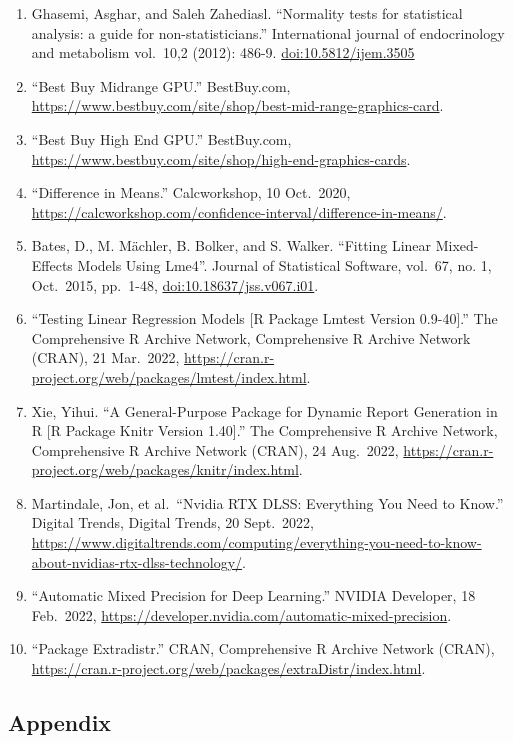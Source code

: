 \documentclass[
]{article}
\begin{document}
\begin{enumerate}
\item
  Ghasemi, Asghar, and Saleh Zahediasl. ``Normality tests for
  statistical analysis: a guide for non-statisticians.'' International
  journal of endocrinology and metabolism vol.~10,2 (2012): 486-9.
  \url{doi:10.5812/ijem.3505}
\item
  ``Best Buy Midrange GPU.'' BestBuy.com,
  \url{https://www.bestbuy.com/site/shop/best-mid-range-graphics-card}.
\item
  ``Best Buy High End GPU.'' BestBuy.com,
  \url{https://www.bestbuy.com/site/shop/high-end-graphics-cards}.
\item
  ``Difference in Means.'' Calcworkshop, 10 Oct.~2020,
  \url{https://calcworkshop.com/confidence-interval/difference-in-means/}.
\item
  Bates, D., M. Mächler, B. Bolker, and S. Walker. ``Fitting Linear
  Mixed-Effects Models Using Lme4''. Journal of Statistical Software,
  vol.~67, no. 1, Oct.~2015, pp.~1-48, \url{doi:10.18637/jss.v067.i01}.
\item
  ``Testing Linear Regression Models {[}R Package Lmtest Version
  0.9-40{]}.'' The Comprehensive R Archive Network, Comprehensive R
  Archive Network (CRAN), 21 Mar.~2022,
  \url{https://cran.r-project.org/web/packages/lmtest/index.html}.
\item
  Xie, Yihui. ``A General-Purpose Package for Dynamic Report Generation
  in R {[}R Package Knitr Version 1.40{]}.'' The Comprehensive R Archive
  Network, Comprehensive R Archive Network (CRAN), 24 Aug.~2022,
  \url{https://cran.r-project.org/web/packages/knitr/index.html}.
\item
  Martindale, Jon, et al.~``Nvidia RTX DLSS: Everything You Need to
  Know.'' Digital Trends, Digital Trends, 20 Sept.~2022,
  \url{https://www.digitaltrends.com/computing/everything-you-need-to-know-about-nvidias-rtx-dlss-technology/}.
\item
  ``Automatic Mixed Precision for Deep Learning.'' NVIDIA Developer, 18
  Feb.~2022,
  \url{https://developer.nvidia.com/automatic-mixed-precision}.
\item
  ``Package Extradistr.'' CRAN, Comprehensive R Archive Network (CRAN),
  \url{https://cran.r-project.org/web/packages/extraDistr/index.html}.
\end{enumerate}

\newpage

\hypertarget{appendix}{%
\subsection{Appendix}\label{appendix}}
\end{document}
